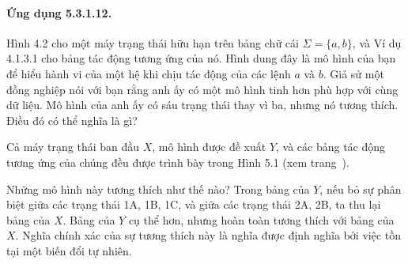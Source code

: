 \paragraph{Ứng dụng 5.3.1.12.} Hình 4.2 cho một máy trạng thái hữu hạn trên bảng chữ cái $\Sigma=\{a,b\}$, và Ví dụ 4.1.3.1 cho bảng tác động tương ứng của nó. Hình dung đây là mô hình của bạn để hiểu hành vi của một hệ khi chịu tác động của các lệnh $a$ và $b$. Giả sử một đồng nghiệp nói với bạn rằng anh ấy có một mô hình tinh hơn phù hợp với cùng dữ liệu. Mô hình của anh ấy có sáu trạng thái thay vì ba, nhưng nó tương thích. Điều đó có thể nghĩa là gì?

Cả máy trạng thái ban đầu $X$, mô hình được đề xuất $Y$, và các bảng tác động tương ứng của chúng đều được trình bày trong Hình 5.1 (xem trang~\pageref{fig:ctfive-state-machines}).

Những mô hình này tương thích như thế nào? Trong bảng của $Y$, nếu bỏ sự phân biệt giữa các trạng thái 1A, 1B, 1C, và giữa các trạng thái 2A, 2B, ta thu lại bảng của $X$. Bảng của $Y$ cụ thể hơn, nhưng hoàn toàn tương thích với bảng của $X$. Nghĩa chính xác của sự tương thích này là nghĩa được định nghĩa bởi việc tồn tại một biến đổi tự nhiên.

